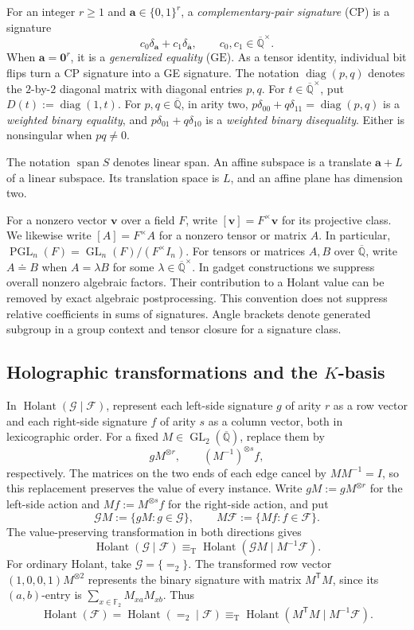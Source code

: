 \documentclass[11pt,letterpaper,onecolumn]{article}
\theoremstyle{plain}
\theoremstyle{definition}
\theoremstyle{remark}
\newcommand{\AlgNums}{\overline{\mathbb Q}}
\newcommand{\Ftwo}{\mathbb F_2}
\newcommand{\cF}{\mathcal F}
\newcommand{\cG}{\mathcal G}
\newcommand{\Holant}{\operatorname{Holant}}
\newcommand{\PGL}{\operatorname{PGL}}
\newcommand{\GL}{\operatorname{GL}}
\newcommand{\diag}{\operatorname{diag}}
\newcommand{\Span}{\operatorname{span}}
\newcommand{\GE}{\mathrm{GE}}
\newcommand{\CP}{\mathrm{CP}}
\newcommand{\Eq}{=}
\newcommand{\zero}{\mathbf 0}
\newcommand{\equivT}{\equiv_{\mathrm T}}
\begin{document}
For an integer \(r\ge1\) and \({\mathbf a}\in\{0,1\}^r\), a
\emph{complementary-pair signature} (\(\CP\)) is a signature
\begin{equation*}
    c_0\delta_{\mathbf a}+c_1\delta_{\bar {\mathbf a}},
    \qquad c_0,c_1\in\AlgNums^\times.
\end{equation*}
When \({\mathbf a}=\zero^r\), it is a \emph{generalized equality} (\(\GE\)).
As a tensor identity, individual bit flips turn a CP signature into a GE signature.
The notation \(\diag(p,q)\) denotes the \(2\)-by-\(2\) diagonal matrix with diagonal entries \(p,q\). For \(t\in\AlgNums^\times\), put \(D(t):=\diag(1,t)\).  For \(p,q\in\AlgNums\), in arity two,
\(p\delta_{00}+q\delta_{11}=\diag(p,q)\) is a \emph{weighted binary
equality}, and \(p\delta_{01}+q\delta_{10}\) is a \emph{weighted binary
disequality}.  Either is nonsingular when \(pq\ne0\).

The notation \(\Span S\) denotes linear span.  An affine subspace is a
	translate \({\mathbf a}+L\) of a linear subspace. Its translation space is \(L\), and an
	affine plane has dimension two.

For a nonzero vector \(\mathbf v\) over a field \(F\), write
\([\mathbf v]=F^\times\mathbf v\) for its projective class.  We likewise
write \([A]=F^\times A\) for a nonzero tensor or matrix \(A\).  In particular,
\(\PGL_n(F)=\GL_n(F)/(F^\times I_n)\).
For tensors or matrices \(A,B\) over \(\AlgNums\), write \(A\doteq B\)
when \(A=\lambda B\) for some \(\lambda\in\AlgNums^\times\).
In gadget constructions we suppress overall nonzero algebraic factors.
Their contribution to a Holant value can be removed by exact algebraic
postprocessing.  This convention does not suppress relative coefficients
in sums of signatures.
Angle brackets denote generated subgroup in a group context and tensor closure for a signature class.

\subsection{Holographic transformations and the
  \texorpdfstring{\(K\)}{K}-basis}
\label{subsec:holographic}

In \(\Holant(\cG\mid\cF)\), represent each left-side signature \(g\)
of arity \(r\) as a row vector and each right-side signature \(f\) of
arity \(s\) as a column vector, both in lexicographic order.  For a fixed
\(M\in\GL_2(\AlgNums)\), replace them by
\[
gM^{\otimes r},\qquad (M^{-1})^{\otimes s}f,
\]
respectively.  The matrices on the two ends of each edge cancel by
\(MM^{-1}=I\), so this replacement preserves the value of every instance.
Write \(gM:=gM^{\otimes r}\) for the left-side action and
\(Mf:=M^{\otimes s}f\) for the right-side action, and put
\[
\cG M:=\{gM:g\in\cG\},\qquad M\cF:=\{Mf:f\in\cF\}.
\]
The value-preserving transformation in both directions gives
\[
\Holant(\cG\mid\cF)\equivT\Holant(\cG M\mid M^{-1}\cF).
\]
For ordinary Holant, take \(\cG=\{\Eq_2\}\).  The transformed row vector
\((1,0,0,1)M^{\otimes2}\) represents the binary signature with matrix
\(M^{\mathsf T}M\), since its \((a,b)\)-entry is
\(\sum_{x\in\Ftwo}M_{xa}M_{xb}\).  Thus
\[
\Holant(\cF)=\Holant(\Eq_2\mid\cF)
\equivT\Holant(M^{\mathsf T}M\mid M^{-1}\cF).
\]
\end{document}
